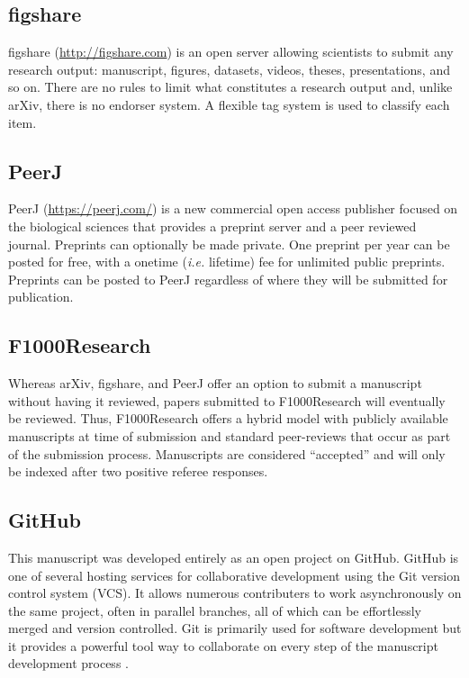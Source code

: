 \documentclass[10pt]{article}
\begin{document}
\subsection*{figshare}

figshare (\href{http://figshare.com}{http://figshare.com}) is an open server
allowing scientists to submit any research output: manuscript, figures,
datasets, videos, theses, presentations, and so on. There are no rules to limit
what constitutes a research output and, unlike arXiv, there is no endorser
system. A flexible tag system is used to classify each item.

\subsection*{PeerJ}

PeerJ (\href{https://peerj.com/}{https://peerj.com/}) is a new commercial open
access publisher focused on the biological sciences that provides a preprint
server and a peer reviewed journal. Preprints can optionally be made private.
One preprint per year can be posted for free, with a onetime (\emph{i.e.}
lifetime) fee for unlimited public preprints. Preprints can be posted to PeerJ
regardless of where they will be submitted for publication.

\subsection*{F1000Research}\label{f1000r}

Whereas arXiv, figshare, and PeerJ offer an option to submit a manuscript
without having it reviewed, papers submitted to F1000Research will eventually be
reviewed. Thus, F1000Research offers a hybrid model with publicly available
manuscripts at time of submission and standard peer-reviews that occur as part
of the submission process. Manuscripts are considered ``accepted'' and will only
be indexed after two positive referee responses.

\subsection*{GitHub}

This manuscript was developed entirely as an open project on GitHub. GitHub is
one of several hosting services for collaborative development using the Git
version control system (VCS). It allows numerous contributers to work
asynchronously on the same project, often in parallel branches, all of which can
be effortlessly merged and version controlled.  Git is primarily used for
software development \cite{aru12} but it provides a powerful tool way to
collaborate on every step of the manuscript development process \cite{ram13}.
\end{document}
